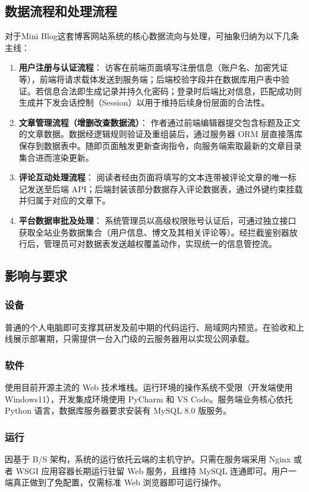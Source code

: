 \documentclass[12pt, a4paper]{ctexart}
\begin{document}
\subsection{数据流程和处理流程}
对于Mini Blog这套博客网站系统的核心数据流向与处理，可抽象归纳为以下几条主线：
\begin{enumerate}
    \item \textbf{用户注册与认证流程}：
    访客在前端页面填写注册信息（账户名、加密凭证等），前端将请求载体发送到服务端；后端校验字段并在数据库用户表中验证。若信息合法即生成记录并持久化密码；登录时后端比对信息，匹配成功则生成并下发会话控制（Session）以用于维持后续身份层面的合法性。
    \item \textbf{文章管理流程（增删改查数据流）}：
    作者通过前端编辑器提交包含标题及正文的文章数据。数据经逻辑规则验证及重组装后，通过服务器 ORM 层直接落库保存到数据表中。随即页面触发更新查询指令，向服务端索取最新的文章目录集合进而渲染更新。
    \item \textbf{评论互动处理流程}：
    阅读者经由页面将填写的文本连带被评论文章的唯一标记发送至后端 API；后端封装该部分数据存入评论数据表，通过外键约束挂载并归属于对应的文章下。
    \item \textbf{平台数据审批及处理}：
    系统管理员以高级权限账号认证后，可通过独立接口获取全站业务数据集合（用户信息、博文及其相关评论等）。经拦截鉴别器放行后，管理员可对数据表发送越权覆盖动作，实现统一的信息管控流。
\end{enumerate}

\subsection{影响与要求}
\subsubsection{设备}
普通的个人电脑即可支撑其研发及前中期的代码运行、局域网内预览。在验收和上线展示部署期，只需提供一台入门级的云服务器用以实现公网承载。

\subsubsection{软件}
使用目前开源主流的 Web 技术堆栈。运行环境的操作系统不受限（开发端使用 Windows11），开发集成环境使用 PyCharm 和 VS Code。服务端业务核心依托 Python 语言，数据库服务器要求安装有 MySQL 8.0 版服务。

\subsubsection{运行}
因基于 B/S 架构，系统的运行依托云端的主机守护。只需在服务端采用 Nginx 或者 WSGI 应用容器长期运行驻留 Web 服务，且维持 MySQL 连通即可。用户一端真正做到了免配置，仅需标准 Web 浏览器即可运行操作。
\end{document}
